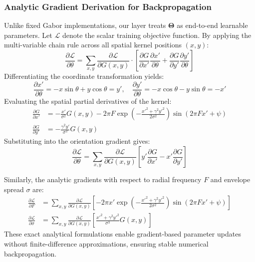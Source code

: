 \subsubsection{Analytic Gradient Derivation for Backpropagation}
Unlike fixed Gabor implementations, our layer treats $\mathbf{\Theta}$ as end-to-end learnable parameters. Let $\mathcal{L}$ denote the scalar training objective function. By applying the multi-variable chain rule across all spatial kernel positions $(x, y)$:
\begin{equation}
    \frac{\partial \mathcal{L}}{\partial \theta} = \sum_{x, y} \frac{\partial \mathcal{L}}{\partial G(x, y)} \cdot \left[ \frac{\partial G}{\partial x'} \frac{\partial x'}{\partial \theta} + \frac{\partial G}{\partial y'} \frac{\partial y'}{\partial \theta} \right]
\end{equation}
Differentiating the coordinate transformation yields:
\begin{equation}
    \frac{\partial x'}{\partial \theta} = -x\sin\theta + y\cos\theta = y', \quad \frac{\partial y'}{\partial \theta} = -x\cos\theta - y\sin\theta = -x'
\end{equation}
Evaluating the spatial partial derivatives of the kernel:
\begin{align}
    \frac{\partial G}{\partial x'} &= -\frac{x'}{\sigma^2} G(x, y) - 2\pi F \exp\left( -\frac{{x'}^2 + \gamma^2 {y'}^2}{2\sigma^2} \right) \sin\left( 2\pi F x' + \psi \right) \\
    \frac{\partial G}{\partial y'} &= -\frac{\gamma^2 y'}{\sigma^2} G(x, y)
\end{align}
Substituting into the orientation gradient gives:
\begin{equation}
    \frac{\partial \mathcal{L}}{\partial \theta} = \sum_{x, y} \frac{\partial \mathcal{L}}{\partial G(x, y)} \left[ y' \frac{\partial G}{\partial x'} - x' \frac{\partial G}{\partial y'} \right]
\end{equation}

Similarly, the analytic gradients with respect to radial frequency $F$ and envelope spread $\sigma$ are:
\begin{align}
    \frac{\partial \mathcal{L}}{\partial F} &= \sum_{x, y} \frac{\partial \mathcal{L}}{\partial G(x, y)} \left[ -2\pi x' \exp\left( -\frac{{x'}^2 + \gamma^2 {y'}^2}{2\sigma^2} \right) \sin\left( 2\pi F x' + \psi \right) \right] \\
    \frac{\partial \mathcal{L}}{\partial \sigma} &= \sum_{x, y} \frac{\partial \mathcal{L}}{\partial G(x, y)} \left[ \frac{{x'}^2 + \gamma^2 {y'}^2}{\sigma^3} G(x, y) \right]
\end{align}
These exact analytical formulations enable gradient-based parameter updates without finite-difference approximations, ensuring stable numerical backpropagation.

